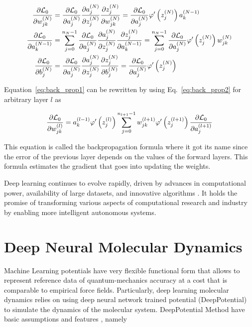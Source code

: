\begin{align}
    \pdv{\mathcal{L}_0}{w^{(N)}_{jk}} & =
    \pdv{\mathcal{L}_0}{a^{(N)}_j}
    \pdv{a^{(N)}_j}{z^{(N)}_j} \pdv{z^{(N)}_j}{w^{(N)}_{jk}}  =
    \pdv{\mathcal{L}_0}{a^{(N)}_j}
    \varphi'
    \left( z^{(N)}_j \right)  a^{(N-1)}_k
    \label{eq:back_prop1}
    \\
    \pdv{\mathcal{L}_0}{a^{(N-1)}_k}  & = \sum_{j=0}^{n_N-1}
    \pdv{\mathcal{L}_0}{a^{(N)}_j}
    \pdv{a^{(N)}_j}{z^{(N)}_j} \pdv{z^{(N)}_j}{a^{(N-1)}_k }  =
    \sum_{j=0}^{n_N-1} \pdv{\mathcal{L}_0}{a^{(N)}_j}
    \varphi'
    \left( z^{(N)}_j \right)  w^{(N)}_{jk}
    \label{eq:back_prop2}
    \\
    \pdv{\mathcal{L}_0}{b^{(N)}_j}    & =
    \pdv{\mathcal{L}_0}{a^{(N)}_j}
    \pdv{a^{(N)}_j}{z^{(N)}_j} \pdv{z^{(N)}_j}{b^{(N)}_j}     =
    \pdv{\mathcal{L}_0}{a^{(N)}_j}
    \varphi'
    \left( z^{(N)}_j \right)
\end{align}

Equation~\eqref{eq:back_prop1} can be rewritten by using
Eq.~\eqref{eq:back_prop2} for arbitrary layer $l$ as

\begin{equation}
    \pdv{\mathcal{L}_0}{w^{(l)}_{jk}} =  a^{(l-1)}_k \varphi'\left( z^{(l)}_j
    \right) \sum_{j=0}^{n_{l+1}-1}
    w^{(l+1)}_{jk} \varphi'
    \left( z^{(l+1)}_j \right)	 \pdv{\mathcal{L}_0}{a^{(l+1)}_j}
\end{equation}

This equation is  called the backpropagation formula where it got its name
since the error
of the
previous layer depends on the values of the forward layers. This formula
estimates the gradient that goes into updating the weights.

Deep learning continues to evolve rapidly, driven by advances in
computational power, availability of large datasets, and innovative algorithms \cite{lecun2015deep,Pramod2021,Sarker2021}.
It holds the promise of transforming various aspects of computational research
and industry
by enabling more intelligent autonomous systems.

\section{Deep Neural Molecular Dynamics}
Machine Learning potentials have very flexible functional form that allows to
represent reference data of quantum-mechanics accuracy at a cost that is
comparable to empirical force fields. Particularly, deep learning molecular
dynamics relies on using deep neural network trained potential (DeepPotential)
to simulate the
dynamics of the molecular system.  DeepPotential Method have basic assumptions
and features
\cite{zhang2018deep,zhang2018end},
namely

